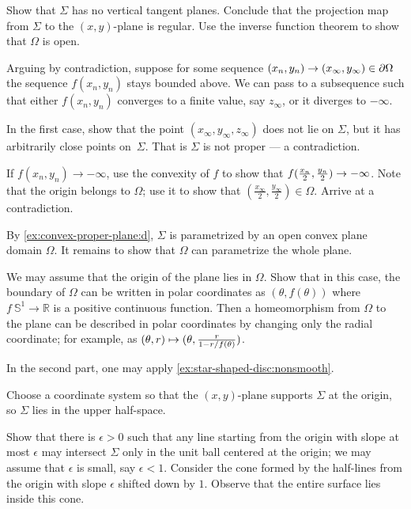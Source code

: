 \begin{multicols}{2}
Show that $\Sigma$ has no vertical tangent planes.
Conclude that the projection map from $\Sigma$ to the $(x,y)$-plane is regular.
Use the inverse function theorem to show that $\Omega$ is open.


Arguing by contradiction, suppose for some sequence $(x_n,y_n)\z\to(x_\infty,y_\infty)\in \partial\Omega$ the sequence $f(x_n,y_n)$ stays bounded above.
We can pass to a subsequence such that either $f(x_n,y_n)$ converges to a finite value, say $z_\infty$, or it diverges to $-\infty$.

In the first case, show that the point $(x_\infty, y_\infty,z_\infty)$ does not lie on $\Sigma$, but it has arbitrarily close points on~$\Sigma$.
That is $\Sigma$ is not proper --- a contradiction.

If $f(x_n,y_n)\to -\infty$, use the convexity of $f$ to show that $f(\tfrac{x_n}2 ,\tfrac{y_n}2)\z\to -\infty$.
Note that the origin belongs to $\Omega$;
use it to show that $(\tfrac{x_\infty}2, \tfrac{y_\infty}2)\in\Omega$.
Arrive at a contradiction.

By \ref{ex:convex-proper-plane:d}, $\Sigma$ is parametrized by an open convex plane domain $\Omega$.
It remains to show that $\Omega$ can parametrize the whole plane.

We may assume that the origin of the plane lies in $\Omega$.
Show that in this case, the boundary of $\Omega$ can be written in polar coordinates as $(\theta,f(\theta))$ where $f\:\mathbb{S}^1\to\mathbb{R}$ is a positive continuous function.
Then a homeomorphism from $\Omega$ to the plane can be described in polar coordinates by changing only the radial coordinate;
for example, as 
$(\theta,r)\z\mapsto (\theta,
\tfrac{r}{1-r/f(\theta)})$.

In the second part, one may apply \ref{ex:star-shaped-disc:nonsmooth}.

Choose a coordinate system so that the $(x,y)$-plane supports $\Sigma$ at the origin, so $\Sigma$ lies in the upper half-space. 

Show that there is $\epsilon>0$ such that any line starting from the origin with slope at most $\epsilon$ may intersect $\Sigma$ only in the unit ball centered at the origin;
we may assume that $\epsilon$ is small, say $\epsilon<1$.
Consider the cone formed by the half-lines from the origin with slope $\epsilon$ shifted down by $1$.
Observe that the entire surface lies inside this cone.


\end{multicols}
